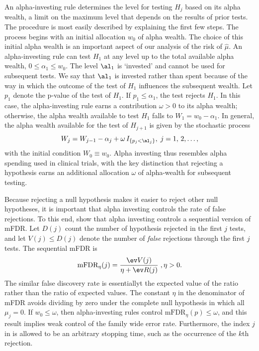 \documentclass[12pt]{article}
\begin{document}
 An alpha-investing rule \citep{fosterstine08} determines the level for testing
 $H_j$ based on its alpha wealth, a limit on the maximum level that depends on
 the results of prior tests.  The procedure is most easily described by
 explaining the first few steps.  The process begins with an initial allocation
 $w_0$  of alpha wealth.  The choice of this initial alpha
 wealth is an important aspect of our analysis of the risk of $\hat\mu$.  An
 alpha-investing rule can test $H_1$ at any level up to the total available
 alpha wealth, $0 \le \alpha_1 \le w_0$.  The level $\al_1$ is `invested' and
 cannot be used for subsequent tests.  We say that $\al_1$ is invested rather
 than spent because of the way in which the outcome of the test of $H_1$
 influences the subsequent wealth.  Let $p_1$ denote the p-value of the test of
 $H_1$.  If $p_1 \le \alpha_1$, the test rejects $H_1$.  In this case, the
 alpha-investing rule earns a contribution $\omega > 0$ \marginpar{$\omega$} to
 its alpha wealth; otherwise, the alpha wealth available to test $H_1$ falls to
 $W_1 = w_0 - \alpha_1$.  In general, the alpha wealth available for the test of
 $H_{j+1}$ is given by the stochastic process 
 \begin{equation}
    W_j = W_{j-1} - \alpha_j + \omega \, I_{\{p_j < \al_j\}}, \; j = 1,\,2,\ldots,
 \label{eq:Wj}
 \end{equation}
 with the initial condition $W_0 \equiv w_0$.  Alpha investing thus resembles
 alpha spending used in clinical trials, with the key distinction that rejecting
 a hypothesis earns an additional allocation $\omega$ of alpha-wealth for
 subsequent testing.  


 Because rejecting a null hypothesis makes it easier to reject other null
 hypotheses, it is important that alpha investing controls the rate of false
 rejections.  To this end, \citet{fosterstine08} show that alpha investing
 controls a sequential version of mFDR.  Let $D(j)$ count the number of
 hypothesis rejected in the first $j$ tests, and let $V(j) \le D(j)$ denote the
 number of {\em false} rejections through the first $j$ tests.  The sequential mFDR is
 \begin{equation}
    \mbox{mFDR}_\eta(j) = \frac{\ev V(j)}{\eta + \ev R(j)} \;, \eta > 0.
 \label{eq:mFDR}
 \end{equation}
 The similar false discovery rate is essentiallyt the expected value of the
 ratio rather than the ratio of expected values.  The constant $\eta$ in the
 denominator of mFDR avoids dividing by zero under the complete null hypothesis
 in which all $\mu_j = 0$.  If $w_0 \le \omega$, then alpha-investing rules
 control $\mbox{mFDR}_\eta(p) \le \omega$, and this result implies weak control
 of the family wide error rate.  Furthermore, the index $j$ in  is
 allowed to be an arbitrary stopping time, such as the occurrence of the $k$th
 rejection.
\end{document}
